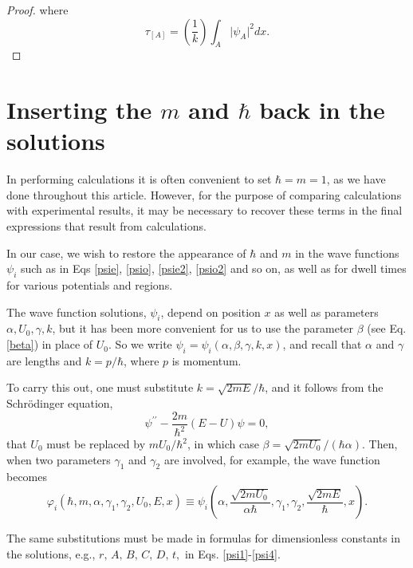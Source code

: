 \documentclass{article}
\numberwithin{equation}{section}
\begin{document}
{\begin{proof}
where
\begin{equation}
\tau_{\left[A\right]}=\left(\frac{1}{k}\right)\int_{A}\vert\psi_{A}\vert^{2}dx.\label{fdt}
\end{equation}
\end{proof}

\section{Inserting the $m$ and $\hbar$ back in the solutions}\label{units}

In performing calculations it is often convenient to set $\hbar=m=1$, as we have done throughout this article.  However, for the purpose of comparing calculations with experimental results, it may be necessary to recover these terms in the final expressions that result from calculations.

In our case, we wish to restore the appearance of  $\hbar$ and $m$ in the wave functions $\psi_i$ such as in Eqs \eqref{psie}, \eqref{psio}, \eqref{psie2}, \eqref{psio2} and so on, as well as for dwell times for various potentials and regions.

The wave function solutions, $\psi_i$, depend on position $x$ as well as parameters $\alpha,U_0,\gamma,k$, but it has been more convenient for us to use the parameter $\beta$ (see Eq.\eqref{beta}) in place of $U_0$. So we write $\psi_i=\psi_i(\alpha,\beta,\gamma,k,x)$, and recall that $\alpha$ and $\gamma$ are lengths and $k=p/\hbar$, where $p$ is momentum.

To carry this out, one must substitute $k=\sqrt{2mE}/\hbar$, and it follows from the Schr\"odinger equation,
\begin{equation}
\label{schroed}
\psi^{\prime\prime}-\frac{2m}{\hbar^2}(E-U)\psi=0,
\end{equation}
 that  $U_0$ must be replaced by $mU_0/\hbar^2$, in which case $\beta=\sqrt{2mU_0}/(\hbar\alpha)$. Then, when two parameters $\gamma_1$ and $\gamma_2$ are involved, for example,  the wave function becomes
\begin{equation}
\label{mnot1}
\varphi_i(\hbar, m, \alpha, \gamma_1,\gamma_2, U_0, E, x)\equiv\psi_i\left(\alpha, \frac{\sqrt{2mU_0}}{\alpha\hbar}, \gamma_1,\gamma_2, \frac{\sqrt{2mE}}{\hbar},x\right).
\end{equation}

The same substitutions must be made in formulas for dimensionless constants in the solutions, e.g., $r,\,A,\,B,\,C,\,D,\,t,$ in Eqs. \eqref{psi1}-\eqref{psi4}.

}
\end{document}

